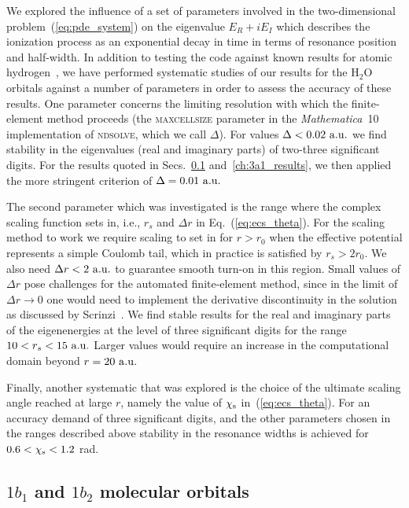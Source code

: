 We explored the influence of a set of parameters involved in the
two-dimensional problem~(\ref{eq:pde_system}) on the eigenvalue
$E_{R}+iE_{I}$ which describes the ionization process as an
exponential decay in time in terms of resonance position and
half-width. In addition to testing the code against known results for
atomic hydrogen~\cite{Telnov_1989}, we have performed systematic
studies of our results for the H$_{2}$O orbitals against a number of
parameters in order to assess the accuracy of these results. One
parameter concerns the limiting resolution with which the
finite-element method proceeds (the \textsc{maxcellsize} parameter in
the \emph{Mathematica}~10 implementation of \textsc{ndsolve}, which we
call $\Delta$). For values $\Delta<0.02\ \rm{a.u.}$ we find stability
in the eigenvalues (real and imaginary parts) of two-three significant
digits. For the results quoted in Secs.~\ref{ch:1b1_1b2_results}
and~\ref{ch:3a1_results}, we then applied the more stringent criterion
of $\Delta=0.01\ \rm{a.u.}$

The second parameter which was investigated is the range where the
complex scaling function sets in, i.e., $r_{s}$ and $\Delta r$ in
Eq.~(\ref{eq:ecs_theta}). For the scaling method to work we require
scaling to set in for $r > r_0$ when the effective potential represents
a simple Coulomb tail, which in practice is satisfied by
$r_{s} > 2r_{0}$. We also need $\Delta r < 2\ \rm{a.u.}$ to guarantee
smooth turn-on in this region. Small values of $\Delta r$ pose
challenges for the automated finite-element method, since in the limit
of $\Delta r \to 0$ one would need to implement the derivative
discontinuity in the solution as discussed by
Scrinzi~\cite{ecsScrinzi}. We find stable results for the real and
imaginary parts of the eigenenergies at the level of three significant
digits for the range $10 < r_{s} < 15\ \rm{a.u.}$ Larger values would
require an increase in the computational domain beyond
$r=20\ \rm{a.u.}$

Finally, another systematic that was explored is the choice of the
ultimate scaling angle reached at large $r$, namely the value of
$\chi_{\rm{s}}$ in~(\ref{eq:ecs_theta}). For an accuracy demand of
three significant digits, and the other parameters chosen in the
ranges described above stability in the resonance widths is achieved
for $0.6< \chi_{\rm{s}} < 1.2$ rad.


\subsection{$1b_{1}$ and $1b_{2}$ molecular orbitals}
\label{ch:1b1_1b2_results}

